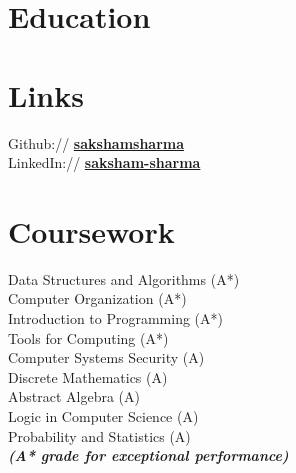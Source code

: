 \documentclass[a4paper]{deedy-resume} %
\begin{document}

\begin{minipage}[t]{0.33\textwidth} %

  \section{Education} 



  \sectionspace


  \sectionspace

  \section{Links} 

  Github:// \href{https://github.com/sakshamsharma}{\bf sakshamsharma} \\
  LinkedIn:// \href{https://www.linkedin.com/in/sakshamsharma}{\bf saksham-sharma} \\

  \sectionspace

  \section{Coursework}
  Data Structures and Algorithms (A*)\\
  Computer Organization (A*)\\
  Introduction to Programming (A*)\\
  Tools for Computing (A*)\\
  Computer Systems Security (A)\\
  Discrete Mathematics (A)\\
  Abstract Algebra (A)\\
  Logic in Computer Science (A)\\
  Probability and Statistics (A)\\

  {\footnotesize \textit{\textbf{(A* grade for exceptional performance) }}} \\


\end{minipage}
\end{document}
